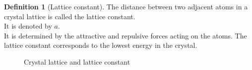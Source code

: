 \documentclass[titlepage, fleqn, a4paper, 12pt, twoside]{article}
\theoremstyle{definition}
\newtheorem{definition}{Definition}
\theoremstyle{theorem}
\begin{document}
\begin{definition}[Lattice constant]
	The distance between two adjacent atoms in a crystal lattice is called the lattice constant.\\
	It is denoted by $a$.\\
	It is determined by the attractive and repulsive forces acting on the atoms.
	The lattice constant corresponds to the lowest energy in the crystal.
	\begin{figure}[h]
		\centering
		\caption{Crystal lattice and lattice constant}
	\end{figure}
\end{definition}
\end{document}
